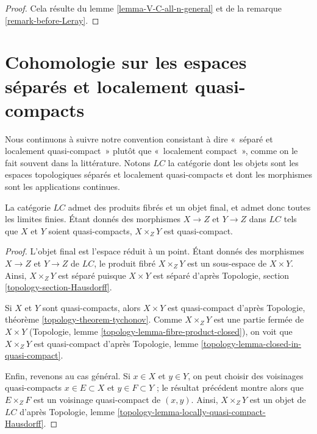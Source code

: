 \begin{proof}
Cela résulte du lemme \ref{lemma-V-C-all-n-general} et de la
remarque \ref{remark-before-Leray}.
\end{proof}
























\section{Cohomologie sur les espaces séparés et localement quasi-compacts}
\label{section-cohomology-LC}

\noindent
Nous continuons à suivre notre convention consistant à dire
«~séparé et localement quasi-compact~» plutôt que «~localement compact~»,
comme on le fait souvent dans la littérature. Notons $\textit{LC}$ la
catégorie dont les objets sont les espaces topologiques séparés et localement
quasi-compacts et dont les morphismes sont les applications continues.

\begin{lemma}
\label{lemma-LC-basic}
La catégorie $\textit{LC}$ admet des produits fibrés et un objet final, et
admet donc toutes les limites finies. Étant donnés des morphismes $X \to Z$
et $Y \to Z$ dans $\textit{LC}$ tels que $X$ et $Y$ soient quasi-compacts,
$X \times_Z Y$ est quasi-compact.
\end{lemma}

\begin{proof}
L'objet final est l'espace réduit à un point. Étant donnés des morphismes
$X \to Z$ et $Y \to Z$ de $\textit{LC}$, le produit fibré $X \times_Z Y$
est un sous-espace de $X \times Y$. Ainsi, $X \times_Z Y$ est séparé puisque
$X \times Y$ est séparé d'après
Topologie, section \ref{topology-section-Hausdorff}.

\medskip\noindent
Si $X$ et $Y$ sont quasi-compacts, alors $X \times Y$ est quasi-compact
d'après Topologie, théorème \ref{topology-theorem-tychonov}.
Comme $X \times_Z Y$ est une partie fermée de $X \times Y$
(Topologie, lemme \ref{topology-lemma-fibre-product-closed}),
on voit que $X \times_Z Y$ est quasi-compact d'après
Topologie, lemme \ref{topology-lemma-closed-in-quasi-compact}.

\medskip\noindent
Enfin, revenons au cas général. Si $x \in X$ et $y \in Y$, on peut choisir
des voisinages quasi-compacts $x \in E \subset X$ et $y \in F \subset Y$ ;
le résultat précédent montre alors que $E \times_Z F$ est un voisinage
quasi-compact de $(x, y)$. Ainsi, $X \times_Z Y$ est un objet de
$\textit{LC}$ d'après
Topologie, lemme \ref{topology-lemma-locally-quasi-compact-Hausdorff}.
\end{proof}

